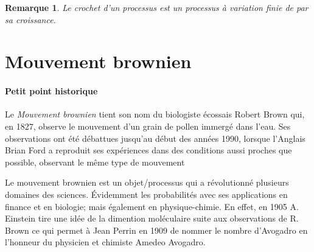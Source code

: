 \documentclass[openany]{book}
\newcommand{\F}{\mathscr{F}}
\newcommand{\E}{\mathbb{E}}
\newcommand{\1}{\mathbbm{1}}
\theoremstyle{thmfont}
\theoremstyle{deffont}
\newtheorem{definition}[definition]{Définition}
\theoremstyle{thmfont}
\theoremstyle{deffont}
\newtheorem*{remark}{Remarque}
\begin{document}
\begin{remark}
  Le crochet d'un processus est un processus à variation finie de par sa croissance.
\end{remark}

%
%
%
%

\section{Mouvement brownien}
\paragraph{Petit point historique}
Le \textit{Mouvement brownien} tient son nom du biologiste écossais Robert Brown qui, en 1827, observe le mouvement d'un grain de pollen immergé dans l'eau. Ses observations ont été débattues jusqu’au début des années 1990, lorsque l’Anglais Brian Ford a reproduit ses expériences dans des conditions aussi proches que possible, observant le même type de mouvement


Le mouvement brownien est un objet/processus qui a révolutionné plusieurs domaines des sciences. Évidemment les probabilités avec ses applications en finance et en biologie; mais également en physique-chimie. En effet, en 1905 A. Einstein tire une idée de la dimention moléculaire suite aux observations de R. Brown ce qui permet à Jean Perrin en 1909 de nommer le nombre d'Avogadro en l'honneur du physicien et chimiste Amedeo Avogadro.
\end{document}
